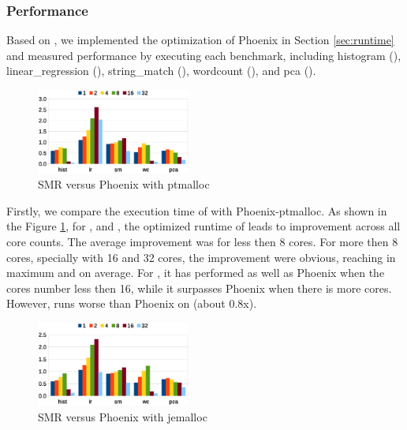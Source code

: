 \subsubsection{Performance}
Based on \myth, we implemented the optimization of Phoenix in Section \ref{sec:runtime} and measured \myds performance by executing each benchmark, including histogram (), linear\_regression (), string\_match (), wordcount (), and pca (). 
\begin{figure}[!h!t]  
	\centering
	\includegraphics[width=0.45\textwidth]{eps/dmr_time_array.eps}
	\caption{SMR versus Phoenix with ptmalloc}
	\label{fig:smr:time:ptmalloc}
\end{figure}


Firstly, we compare the execution time of \myds with Phoenix-ptmalloc. 
As shown in the Figure \ref{fig:smr:time:ptmalloc}, for ,  and , the optimized runtime of \myds leads to improvement across all core counts.
The average improvement was  for less then 8 cores.
For more then 8 cores, specially with 16 and 32 cores, the improvement were obvious, reaching  in maximum and  on average.
For , it has performed as well as Phoenix when the cores number less then 16, while it surpasses Phoenix when there is more cores.
However, \myds runs worse than Phoenix on  (about 0.8x).
\begin{figure}[!h!t]  
	\centering
	\includegraphics[width=0.45\textwidth]{eps/dmr_time_jemalloc.eps}
	\caption{SMR versus Phoenix with jemalloc}
	\label{fig:smr:time:jemalloc}
\end{figure}

